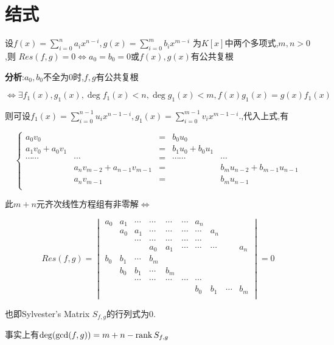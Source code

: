 \section{结式}
设$ f(x)=\sum_{i=0}^{n}{a_ix^{n-i}},g(x)=\sum_{i=0}^{m}{b_ix^{m-i}}$
为$ K[x]$中两个多项式,$ m,n>0$,则
$ Res(f,g)=0\Leftrightarrow a_0=b_0=0$或$ f(x),g(x)$有公共复根

{\bf 分析}:$ a_0,b_0$不全为0时,$ f,g$有公共复根

$ \Leftrightarrow \exists f_1(x),g_1(x),\deg f_1(x)<n,\deg g_1(x)<m,f(x)g_1(x)=g(x)f_1(x)$

则可设$ f_1(x)=\sum_{i=0}^{n-1}{u_ix^{n-1-i}},g_1(x)=\sum_{i=0}^{m-1}{v_ix^{m-1-i}}.$,代入上式,有

\[ \left \{  \begin{array}{lrclr}
a_0v_0		&			&= &b_0u_0		&		\\
a_1v_0+a_0v_1&			&= &b_1u_0+b_0u_1&		\\
\cdots \cdots &\cdots	&= & \cdots\cdots &\cdots		\\
		&{a_nv_{m-2}+a_{n-1}v_{m-1}}&=&		&b_mu_{n-2}+b_{m-1}u_{n-1}\\
		& a_nv_{m-1}&= &				&b_mu_{n-1}\\
\end{array}\right . \]

此$ m+n$元齐次线性方程组有非零解$ \Leftrightarrow $

\[Res(f,g)= \begin{vmatrix}
a_0 & a_1 & \cdots & \cdots & \cdots & \cdots & a_n		&		&	&   \\
	& a_0 & a_1	   & \cdots & \cdots & \cdots & \cdots  &a_n   &	&	\\
	&	  & \cdots & \cdots & \cdots & \cdots & \cdots &		&	&	\\
	&	  &		   & a_0	& a_1	 & \cdots & \cdots & \cdots &	& a_n\\
b_0 & b_1 & \cdots & b_m	&		 &		  &		   &		&	&   \\
	& b_0 & b_1	   & \cdots  &b_m   &	    	&		&		&	&	\\
	&	  & \cdots & \cdots & \cdots & \cdots & \cdots &		&	&	\\
	&	  &		   &		&		&		& b_0		& b_1	& \cdots & b_m\\
\end{vmatrix} =0\]

也即Sylvester's Matrix $ S_{f,g}$的行列式为0.

事实上有$ \deg ( \gcd (f,g) )=m+n-\operatorname{\tiny{rank}} S_{f,g}$ 
\\

